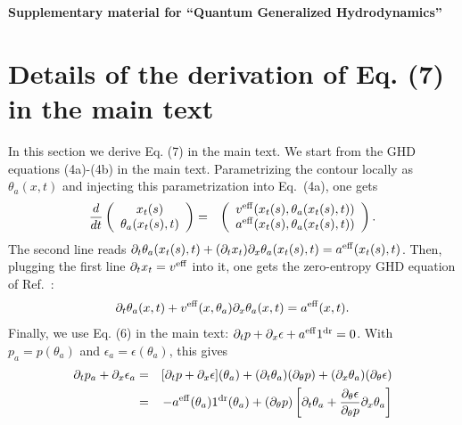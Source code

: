 \documentclass[twocolumn,amsfonts,showpacs,superscriptaddress]{revtex4-1}
\begin{document}
\begin{widetext}


\begin{center}
{\bf Supplementary material for ``Quantum Generalized Hydrodynamics''}
\end{center}


\section{Details of the derivation of Eq. (7) in the main text}


In this section we derive Eq. (7) in the main text. We start from the GHD equations (4a)-(4b) in the main text. Parametrizing the
contour locally as $\theta_a (x,t)$ and injecting this parametrization into Eq.~(4a), one gets
\begin{eqnarray*}
	\frac{d}{dt} \left( \begin{array}{c}
		x_t(s) \\
		\theta_a (x_t(s), t)
	\end{array} \right) &=& \left(  \begin{array}{c}
		v^{\rm eff} (x_t(s), \theta_a(x_t(s),t) ) \\
		a^{\rm eff} (x_t(s), \theta_a(x_t(s),t) )
	\end{array} \right)  .
\end{eqnarray*}
The second line reads $\partial_t \theta_a (x_t(s), t) + (\partial_t x_t) \partial_x \theta_a (x_t(s), t)  =  a^{\rm eff} (x_t(s), t)$. 
Then, plugging the first line $\partial_t x_t = v^{\rm eff}$ into it, one gets the zero-entropy GHD equation of Ref.~\cite{doyon2017large}:
\begin{equation}
	 \partial_t \theta_a (x, t) + v^{\rm eff}(x,\theta_a)  \partial_x \theta_a (x, t)  = a^{\rm eff} (x,t).
\end{equation}
Finally, we use Eq. (6) in the main text: $\partial_t p  + \partial_x \epsilon + a^{\rm eff} 1^{\rm dr} = 0$. With $p_a = p(\theta_a)$ and $\epsilon_a = \epsilon(\theta_a)$, this gives
\begin{eqnarray*}
	\partial_t p_a + \partial_x \epsilon_a &=&  [ \partial_t p  + \partial_x \epsilon]  (\theta_a) + (\partial_t \theta_a) (\partial_{\theta} p)  + (\partial_x \theta_a)  (\partial_{\theta} \epsilon)  \\
	&=& - a^{\rm eff} (\theta_a) 1^{\rm dr}  (\theta_a)  + (\partial_{\theta} p) \left[ \partial_t \theta_a +  \frac{\partial_{\theta} \epsilon}{\partial_{\theta} p}  \partial_x \theta_a\right] \\

\end{eqnarray*}
\end{widetext}
\end{document}
